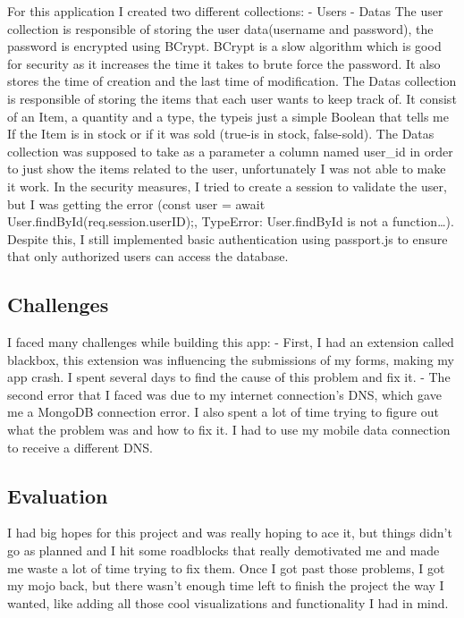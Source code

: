 For this application I created two different collections: - Users -
Datas The user collection is responsible of storing the user
data(username and password), the password is encrypted using BCrypt.
BCrypt is a slow algorithm which is good for security as it increases
the time it takes to brute force the password. It also stores the time
of creation and the last time of modification. The Datas collection is
responsible of storing the items that each user wants to keep track of.
It consist of an Item, a quantity and a type, the typeis just a simple
Boolean that tells me If the Item is in stock or if it was sold (true-is
in stock, false-sold). The Datas collection was supposed to take as a
parameter a column named user\_id in order to just show the items
related to the user, unfortunately I was not able to make it work. In
the security measures, I tried to create a session to validate the user,
but I was getting the error (const user = await
User.findById(req.session.userID);, TypeError: User.findById is not a
function\ldots{}). Despite this, I still implemented basic
authentication using passport.js to ensure that only authorized users
can access the database.

\hypertarget{challenges}{%
\subsection{Challenges}\label{challenges}}

I faced many challenges while building this app: - First, I had an
extension called blackbox, this extension was influencing the
submissions of my forms, making my app crash. I spent several days to
find the cause of this problem and fix it. - The second error that I
faced was due to my internet connection's DNS, which gave me a MongoDB
connection error. I also spent a lot of time trying to figure out what
the problem was and how to fix it. I had to use my mobile data
connection to receive a different DNS.

\hypertarget{evaluation}{%
\subsection{Evaluation}\label{evaluation}}

I had big hopes for this project and was really hoping to ace it, but
things didn't go as planned and I hit some roadblocks that really
demotivated me and made me waste a lot of time trying to fix them. Once
I got past those problems, I got my mojo back, but there wasn't enough
time left to finish the project the way I wanted, like adding all those
cool visualizations and functionality I had in mind.

